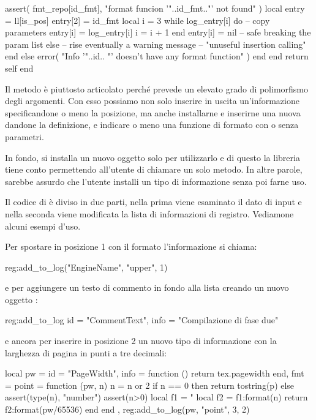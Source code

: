 \begin{lines}
                assert(
                    fmt_repo[id_fmt],
                    "format funcion '"..id_fmt.."' not found"
                )
                local entry = ll[is_pos]
                entry[2] = id_fmt
                local i = 3
                while log_entry[i] do -- copy parameters
                   entry[i] = log_entry[i]
                   i = i + 1
                end
                entry[i] = nil -- safe breaking the param list
            else
                -- rise eventually a warning message
                -- "unuseful insertion calling"
            end
        else
            error(
                "Info '"..id..
                "' doesn't have any format function"
            )
        end
    end
    return self
end
\end{lines}

Il metodo è piuttosto articolato perché prevede un elevato grado di polimorfismo
degli argomenti. Con esso possiamo non solo inserire in uscita un'informazione
specificandone o meno la posizione, ma anche installarne e inserirne una nuova
dandone la definizione, e indicare o meno una funzione di formato con o senza
parametri.

In fondo, si installa un nuovo oggetto  solo per utilizzarlo e di
questo la libreria tiene conto permettendo all'utente di chiamare un solo
metodo. In altre parole, sarebbe assurdo che l'utente installi un tipo di
informazione senza poi farne uso.

Il codice di  è diviso in due parti, nella prima viene
esaminato il dato di input e nella seconda viene modificata la lista di
informazioni di registro. Vediamone alcuni esempi d'uso.

Per spostare in posizione 1 con il formato  l'informazione
 si chiama:
\begin{lines}
reg:add_to_log({"EngineName", "upper"}, 1)
\end{lines}
e per aggiungere un testo di commento in fondo alla lista creando un nuovo
oggetto :
\begin{lines}
reg:add_to_log{
    id = "CommentText",
    info = "Compilazione di fase due"
}
\end{lines}
e ancora per inserire in posizione 2 un nuovo tipo di informazione con la
larghezza di pagina in punti a tre decimali:
\begin{lines}
local pw = {
    id = "PageWidth",
    info = function () return tex.pagewidth end,
    fmt = {
        point = function (pw, n)
            n = n or 2
            if n == 0 then
                return tostring(p)
            else
                assert(type(n), "number")
                assert(n>0)
                local f1 = "%
                local f2 = f1:format(n)
                return f2:format(pw/65536) 
            end
        end
    },
}
reg:add_to_log({pw, "point", 3}, 2)
\end{lines}

